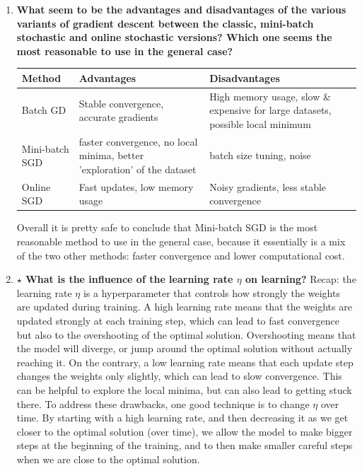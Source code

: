 \documentclass[12pt,a4paper]{article}
\begin{document}
\begin{enumerate}[resume]
    \item \textbf{What seem to be the advantages and disadvantages of the various variants of gradient descent
                between the classic, mini-batch stochastic and online stochastic versions? Which one seems the most
                reasonable to use in the general case?} 
    \begin{tabularx}{0.9\textwidth}{l X X}
        \hline
        \textbf{Method} & \textbf{Advantages} & \textbf{Disadvantages} \\ \hline
        Batch GD & Stable convergence, accurate gradients & High memory usage, slow \& expensive for large datasets, possible local minimum \\ \hline
        Mini-batch SGD & faster convergence, no local minima, better 'exploration' of the dataset & batch size tuning, noise \\ \hline
        Online SGD & Fast updates, low memory usage & Noisy gradients, less stable convergence \\ \hline
    \end{tabularx} \newline
    \newline
    Overall it is pretty safe to conclude that Mini-batch SGD is the most reasonable method to use in the general case,
    because it essentially is a mix of the two other methods: faster convergence and lower computational cost.

    \item \textbf{$\star$ What is the influence of the learning rate $\eta$ on learning?} \newline
    Recap: the learning rate $\eta$ is a hyperparameter that controls how strongly the weights are updated during training. \newline
    A high learning rate means that the weights are updated strongly at each training step, which can lead to fast convergence but also 
    to the overshooting of the optimal solution. Overshooting means that the model will diverge, or jump around the optimal solution without actually reaching it. \newline
    On the contrary, a low learning rate means that each update step changes the weights only slightly, which can lead to slow convergence.
    This can be helpful to explore the local minima, but can also lead to getting stuck there. \newline
    To address these drawbacks, one good technique is to change $\eta$ over time. By starting with a high learning rate, and then
    decreasing it as we get closer to the optimal solution (over time), we allow the model to make bigger steps at the beginning of the training, 
    and to then make smaller careful steps when we are close to the optimal solution.


\end{enumerate}
\end{document}
